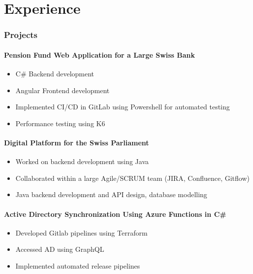 \section{Experience}
\subsubsection*{Projects}
\paragraph{Pension Fund Web Application for a Large Swiss Bank}
\begin{itemize}
    \item C\# Backend development
    \item Angular Frontend development
    \item Implemented CI/CD in GitLab using Powershell for automated testing
    \item Performance testing using K6
\end{itemize}
\paragraph{Digital Platform for the Swiss Parliament}
\begin{itemize}
    \item Worked on backend development using Java
    \item Collaborated within a large Agile/SCRUM team (JIRA, Confluence, Gitflow)
    \item Java backend development and API design, database modelling
\end{itemize}
\paragraph{Active Directory Synchronization Using Azure Functions in C\#}
\begin{itemize}
    \item Developed Gitlab pipelines using Terraform
    \item Accessed AD using GraphQL
    \item Implemented automated release pipelines
\end{itemize}
\vspace{1.25em}
\dottedline
{}
\vspace{-1em}
